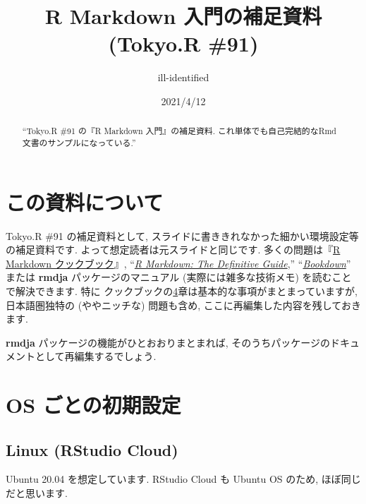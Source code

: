 \documentclass[
]{bxjsarticle}
\title{R Markdown 入門の補足資料 (Tokyo.R \#91)}
\author{ill-identified}
\date{2021/4/12}
\begin{document}
\maketitle
\begin{abstract}
``Tokyo.R \#91 の『R Markdown 入門』の補足資料. これ単体でも自己完結的なRmd文書のサンプルになっている.''
\end{abstract}

{
\setcounter{tocdepth}{3}
\tableofcontents
}
\hypertarget{ux3053ux306eux8cc7ux6599ux306bux3064ux3044ux3066}{%
\section{この資料について}\label{ux3053ux306eux8cc7ux6599ux306bux3064ux3044ux3066}}

Tokyo.R \#91 の補足資料として, スライドに書ききれなかった細かい環境設定等の補足資料です. よって想定読者は元スライドと同じです. 多くの問題は『\href{https://gedevan-aleksizde.github.io/rmarkdown-cookbook/}{R Markdown クックブック}』, ``\href{https://bookdown.org/yihui/rmarkdown/markdown-syntax.html}{\emph{R Markdown: The Definitive Guide}},'' ``\href{}{\emph{Bookdown}}'' または \textbf{rmdja} パッケージのマニュアル (実際には雑多な技術メモ) を読むことで解決できます. 特に クックブックの\href{https://gedevan-aleksizde.github.io/rmarkdown-cookbook/document-elements.html}{4}章は基本的な事項がまとまっていますが, 日本語圏独特の (ややニッチな) 問題も含め, ここに再編集した内容を残しておきます.

\textbf{rmdja} パッケージの機能がひとおおりまとまれば, そのうちパッケージのドキュメントとして再編集するでしょう.

\hypertarget{os-ux3054ux3068ux306eux521dux671fux8a2dux5b9a}{%
\section{OS ごとの初期設定}\label{os-ux3054ux3068ux306eux521dux671fux8a2dux5b9a}}

\hypertarget{linux-rstudio-cloud}{%
\subsection{Linux (RStudio Cloud)}\label{linux-rstudio-cloud}}

Ubuntu 20.04 を想定しています. RStudio Cloud も Ubuntu OS のため, ほぼ同じだと思います.
\end{document}
